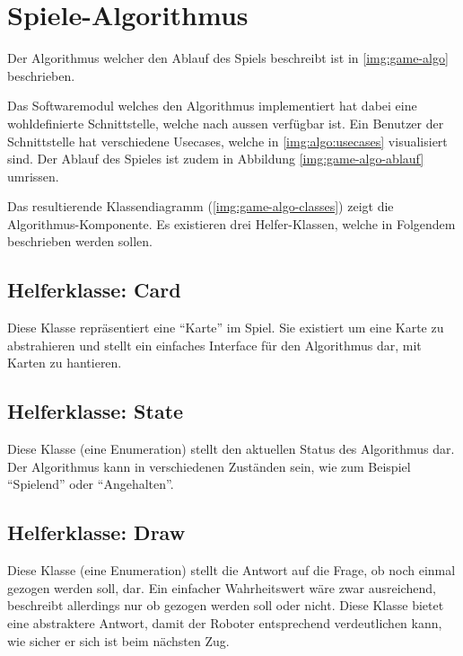 \chapter{Spiele-Algorithmus}

    Der Algorithmus welcher den Ablauf des Spiels beschreibt ist in
    \ref{img:game-algo} beschrieben.

    Das Softwaremodul welches den Algorithmus implementiert hat dabei eine
    wohldefinierte Schnittstelle, welche nach aussen verfügbar ist.
    Ein Benutzer der Schnittstelle hat verschiedene Usecases, welche in
    \ref{img:algo:usecases} visualisiert sind.
    Der Ablauf des Spieles ist zudem in Abbildung \ref{img:game-algo-ablauf}
    umrissen.

    Das resultierende Klassendiagramm (\ref{img:game-algo-classes}) zeigt die
    Algorithmus-Komponente.
    Es existieren drei Helfer-Klassen, welche in Folgendem beschrieben werden
    sollen.

    \section{Helferklasse: Card}

        Diese Klasse repräsentiert eine ``Karte'' im Spiel.
        Sie existiert um eine Karte zu abstrahieren und stellt ein einfaches
        Interface für den Algorithmus dar, mit Karten zu hantieren.

    \section{Helferklasse: State}

        Diese Klasse (eine Enumeration) stellt den aktuellen Status des
        Algorithmus dar.
        Der Algorithmus kann in verschiedenen Zuständen sein, wie zum Beispiel
        ``Spielend'' oder ``Angehalten''.

    \section{Helferklasse: Draw}

        Diese Klasse (eine Enumeration) stellt die Antwort auf die Frage, ob
        noch einmal gezogen werden soll, dar.
        Ein einfacher Wahrheitswert wäre zwar ausreichend, beschreibt allerdings
        nur ob gezogen werden soll oder nicht.
        Diese Klasse bietet eine abstraktere Antwort, damit der Roboter
        entsprechend verdeutlichen kann, wie sicher er sich ist beim nächsten
        Zug.

